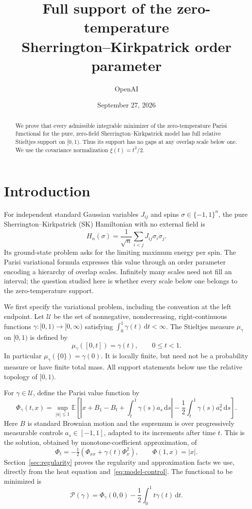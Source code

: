 \documentclass[11pt]{article}
\title{Full support of the zero-temperature\\
Sherrington--Kirkpatrick order parameter}
\author{OpenAI}
\date{September 27, 2026}
\newcommand{\E}{\mathbb E}
\newcommand{\dd}{\mathrm d}
\theoremstyle{remark}
\numberwithin{equation}{section}
\begin{document}
\maketitle
\begin{abstract}
We prove that every admissible integrable minimizer of the zero-temperature
Parisi functional for the pure, zero-field Sherrington--Kirkpatrick model
has full relative Stieltjes support on $[0,1)$. Thus its support has no
gaps at any overlap scale below one. We use the covariance normalization
$\xi(t)=t^2/2$.
\end{abstract}

\section{Introduction}
For independent standard Gaussian variables $J_{ij}$ and spins
$\sigma\in\{-1,1\}^n$, the pure Sherrington--Kirkpatrick (SK) Hamiltonian
with no external field is
\[
 H_n(\sigma)=\frac1{\sqrt n}\sum_{i<j}J_{ij}\sigma_i\sigma_j.
\]
Its ground-state problem asks for the limiting maximum energy per spin.
The Parisi variational formula expresses this value through an order
parameter encoding a hierarchy of overlap scales. Infinitely many
scales need not fill an interval; the question studied here is whether
every scale below one belongs to the zero-temperature support.

We first specify the variational problem, including the convention at the
left endpoint. Let $\mathcal U$ be the set of nonnegative, nondecreasing,
right-continuous functions $\gamma:[0,1)\to[0,\infty)$ satisfying
$\int_0^1\gamma(t)\,\dd t<\infty$. The Stieltjes measure $\mu_\gamma$
on $[0,1)$ is defined by
\[
 \mu_\gamma([0,t])=\gamma(t),\qquad 0\leq t<1.
\]
In particular $\mu_\gamma(\{0\})=\gamma(0)$. It is locally finite,
but need not be a probability measure or have finite total mass.
All support statements below use the relative topology of $[0,1)$.

For $\gamma\in\mathcal U$, define the Parisi value function by
\begin{equation}\label{eq:model-control}
 \Phi_\gamma(t,x)=\sup_{|a|\leq1}\E\left[
 \left|x+B_1-B_t+\int_t^1\gamma(s)a_s\,\dd s\right|
 -\frac12\int_t^1\gamma(s)a_s^2\,\dd s\right].
\end{equation}
Here $B$ is standard Brownian motion and the supremum is over progressively
measurable controls $a_s\in[-1,1]$, adapted to its increments after time
$t$. This is the solution, obtained by monotone-coefficient approximation,
of
\begin{equation}\label{eq:model-pde}
 \Phi_t=-\tfrac12(\Phi_{xx}+\gamma(t)\Phi_x^2),
 \qquad \Phi(1,x)=|x|.
\end{equation}
Section~\ref{sec:regularity} proves the regularity and approximation facts
we use, directly from the heat equation and~\eqref{eq:model-control}.
The functional to be minimized is
\begin{equation}\label{eq:model-functional}
 \mathcal P(\gamma)=\Phi_\gamma(0,0)
                  -\frac12\int_0^1t\gamma(t)\,\dd t.
\end{equation}
\end{document}
